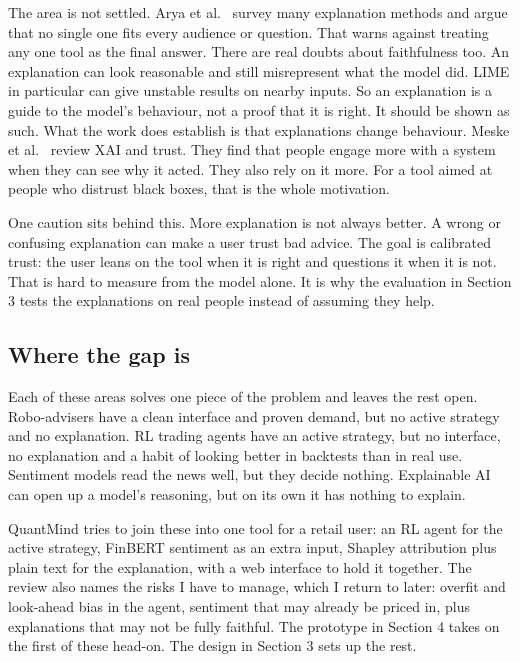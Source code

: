 \documentclass[12pt,twoside,letterpaper]{article}
\begin{document}
The area is not settled. Arya et al.\ \cite{arya2019} survey many explanation
methods and argue that no single one fits every audience or question. That warns
against treating any one tool as the final answer. There are real doubts about
faithfulness too. An explanation can look reasonable and still misrepresent what the
model did. LIME in particular can give unstable results on nearby inputs. So an
explanation is a guide to the model's behaviour, not a proof that it is right. It
should be shown as such. What the work does establish is that explanations change
behaviour. Meske et al.\ \cite{meske2022} review XAI and trust. They find that
people engage more with a system when they can see why it acted. They also rely on
it more. For a tool aimed at people who distrust black boxes, that is the whole
motivation.

One caution sits behind this. More explanation is not always better. A wrong or
confusing explanation can make a user trust bad advice. The goal is calibrated
trust: the user leans on the tool when it is right and questions it when it is not.
That is hard to measure from the model alone. It is why the evaluation in Section 3
tests the explanations on real people instead of assuming they help.

\subsection{Where the gap is}

Each of these areas solves one piece of the problem and leaves the rest open.
Robo-advisers have a clean interface and proven demand, but no active strategy and
no explanation. RL trading agents have an active strategy, but no interface, no
explanation and a habit of looking better in backtests than in real use. Sentiment
models read the news well, but they decide nothing. Explainable AI can open up a
model's reasoning, but on its own it has nothing to explain.

QuantMind tries to join these into one tool for a retail user: an RL agent for the
active strategy, FinBERT sentiment as an extra input, Shapley attribution plus plain
text for the explanation, with a web interface to hold it together. The review also
names the risks I have to manage, which I return to later: overfit and look-ahead
bias in the agent, sentiment that may already be priced in, plus explanations that
may not be fully faithful. The prototype in Section 4 takes on the first of these
head-on. The design in Section 3 sets up the rest.
\end{document}

